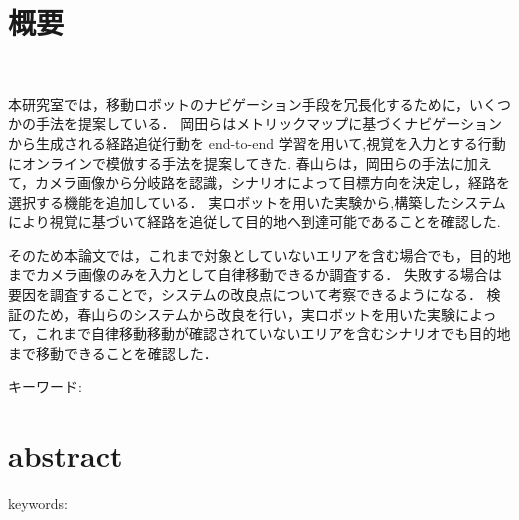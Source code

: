 \chapter*{概要}
\thispagestyle{empty}
%
\begin{center}
  \scalebox{1.5}{タイトル}\\
\end{center}
\vspace{1.0zh}
%
本研究室では，移動ロボットのナビゲーション手段を冗長化するために，いくつかの手法を提案している．
岡田らはメトリックマップに基づくナビゲーションから生成される経路追従行動を end-to-end 学習を用いて,視覚を入力とする行動にオンラインで模倣する手法を提案してきた.
春山らは，岡田らの手法に加えて，カメラ画像から分岐路を認識，シナリオによって目標方向を決定し，経路を選択する機能を追加している．
実ロボットを用いた実験から,構築したシステムにより視覚に基づいて経路を追従して目的地へ到達可能であることを確認した.

そのため本論文では，これまで対象としていないエリアを含む場合でも，目的地までカメラ画像のみを入力として自律移動できるか調査する．
失敗する場合は要因を調査することで，システムの改良点について考察できるようになる．
検証のため，春山らのシステムから改良を行い，実ロボットを用いた実験によって，これまで自律移動移動が確認されていないエリアを含むシナリオでも目的地まで移動できることを確認した．

キーワード: 
%
\newpage
\chapter*{abstract}
\thispagestyle{empty}
%
\begin{center}
  \scalebox{1.3}{title}
\end{center}
\vspace{1.0zh}
%


keywords: 
